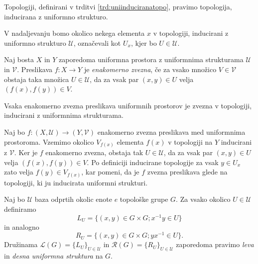 \documentclass[mat1]{fmfdelo}
\newcommand{\Ucurl}{\mathcal{U}}
\begin{document}
\begin{definicija}\label{def:uniinduciranatopo}
Topologiji, definirani v trditvi \ref{trd:uniinduciranatopo}, pravimo topologija, inducirana z uniformno strukturo.
\end{definicija}

\begin{opomba}
	V nadaljevanju bomo okolico nekega elementa $x$ v topologiji, in\-du\-ci\-ra\-ni z uniformno strukturo $\mathcal{U}$, označevali kot $U_x$, kjer bo $U \in \mathcal{U}$.
\end{opomba}

\begin{definicija}\label{def:enakzveznost}
	Naj bosta $X$ in $Y$ zaporedoma uniformna prostora z uniformnima strukturama $\mathcal{U}$ in $\mathcal{V}$. Preslikava $f\colon X \to Y$ je \emph{enakomerno zvezna}, če za vsako množico $V \in \mathcal{V}$ obstaja taka množica $U \in \mathcal{U}$, da za vsak par $(x, y) \in U$ velja $(f(x), f(y)) \in V$.
\end{definicija}

\begin{trditev}\label{trd:enakzveznazvezna}
	Vsaka enakomerno zvezna preslikava uniformnih prostorov je zvezna v topologiji, inducirani z uniformnima strukturama.
\end{trditev}

\begin{dokaz}
	Naj bo $f\colon (X, \mathcal{U}) \to (Y, \mathcal{V})$ enakomerno zvezna preslikava med uniformnima prostoroma. Vzemimo okolico $V_{f(x)}$ elementa $f(x)$ v topologiji na $Y$ inducirani z $\mathcal{V}$. Ker je $f$ enakomerno zvezna, obstaja tak $U \in \mathcal{U}$, da za vsak par $(x, y) \in U$ velja $(f(x), f(y)) \in V$. Po definiciji inducirane topologije za vsak $y \in U_x$ zato velja $f(y) \in V_{f(x)}$, kar pomeni, da je $f$ zvezna preslikava glede na topologiji, ki ju inducirata uniformni strukturi.
\end{dokaz}

\begin{definicija}\label{def:levadesnauni}
	Naj bo $\Ucurl$ baza odprtih okolic enote $e$ topološke grupe $G$. Za vsako okolico $U \in \Ucurl$ definiramo \[L_U = \lbrace (x, y) \in G \times G ; x^{-1}y \in U \rbrace\] in analogno \[R_U = \lbrace (x, y) \in G \times G ; yx^{-1} \in U \rbrace.\] Družinama $\mathcal{L}(G) = \lbrace L_U \rbrace_{U \in \Ucurl}$ in $\mathcal{R}(G) = \lbrace R_U \rbrace_{U \in \Ucurl}$ zaporedoma pravimo \emph{leva} in \emph{desna uniformna struktura} na $G$.
\end{definicija}
\end{document}
